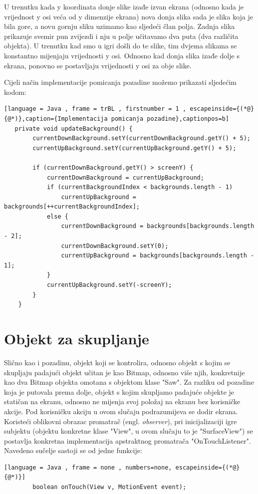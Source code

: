 \documentclass[times, utf8, zavrsni, numeric]{fer}
\begin{document}
	
	U trenutku kada y koordinata donje slike izađe izvan ekrana (odnosno kada je vrijednost y osi veća od y dimenzije ekrana) nova donja slika sada je slika koja je bila gore, a novu gornju sliku uzimamo 
	kao sljedeći član polja. 
	Zadnja slika prikazuje svemir pun zvijezdi i nju u polje učitavamo dva puta (dva različita objekta). U trenutku kad smo u igri došli do te slike, tim dvjema slikama se konstantno mijenjaju vrijednosti y osi.
	Odnosno kad donja slika izađe dolje s ekrana, ponovno se postavljaju vrijednosti y osi za obje slike. 
	
	
	Cijeli način implementacije pomicanja pozadine možemo prikazati sljedećim kodom:
	\renewcommand{\lstlistingname}{Kôd}
	\begin{lstlisting}[language = Java , frame = trBL , firstnumber = 1 , escapeinside={(*@}{@*)},caption={Implementacija pomicanja pozadine},captionpos=b]
   private void updateBackground() {
        currentDownBackground.setY(currentDownBackground.getY() + 5);
        currentUpBackground.setY(currentUpBackground.getY() + 5);

        if (currentDownBackground.getY() > screenY) {
            currentDownBackground = currentUpBackground;
            if (currentBackgroundIndex < backgrounds.length - 1)     
                currentUpBackground = backgrounds[++currentBackgroundIndex]; 
            else {
                currentDownBackground = backgrounds[backgrounds.length - 2];
                currentDownBackground.setY(0);
                currentUpBackground = backgrounds[backgrounds.length - 1];
            }
            currentUpBackground.setY(-screenY);
        }
    }
	\end{lstlisting}



	\section{Objekt za skupljanje}
	Slično kao i pozadinu, objekt koji se kontrolira, odnosno objekt s kojim se skupljaju padajući objekt učitan je kao  Bitmap, odnosno više njih, konkretnije kao dva Bitmap objekta omotana s objektom
	klase "Saw". Za razliku od pozadine koja je putovala prema dolje, objekt s kojim skupljamo padajuće objekte je statičan na ekranu, odnosno ne mijenja svoj položaj na ekranu bez korisničke akcije. Pod korisničku akciju u 
	ovom slučaju podrazumijeva se dodir ekrana. Koristeći oblikovni obrazac promatrač (engl. \textit{observer}), pri inicijalizaciji igre  subjektu (objektu konkretne klase "View", u ovom slučaju to je "SurfaceView")
	se postavlja konkretna implementacija apstraktnog promatrača "OnTouchListener". Navedeno sučelje sastoji se od jedne funkcije:
	\begin{lstlisting}[language = Java , frame = none , numbers=none, escapeinside={(*@}{@*)}]
		boolean onTouch(View v, MotionEvent event); 
	\end{lstlisting}
	
\end{document}
